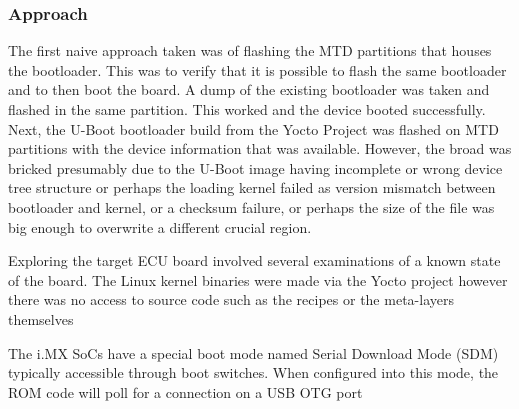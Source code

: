 
\subsubsection*{Approach}

The first naive approach taken was of flashing the MTD partitions that houses the bootloader. This was to verify that it is possible to flash the same bootloader and to then boot the board. A dump of the existing bootloader was taken and flashed in the same partition. This worked and the device booted successfully. Next, the U-Boot bootloader build from the Yocto
Project was flashed on MTD partitions with the device information that was available. However, the broad was bricked presumably due to the U-Boot image having incomplete or wrong device tree structure or perhaps the loading kernel failed as version mismatch between bootloader and kernel, or a checksum failure, or perhaps the size of the file was big enough to overwrite a different crucial region.



Exploring the target ECU board involved several examinations of a known state of the board. The Linux kernel binaries were made via the Yocto project however there was no access to source code such as the recipes or the meta-layers themselves

The i.MX SoCs have a special boot mode named Serial Download Mode (SDM) typically accessible through boot switches. When configured into this mode, the ROM code will poll for a connection on a USB OTG port
